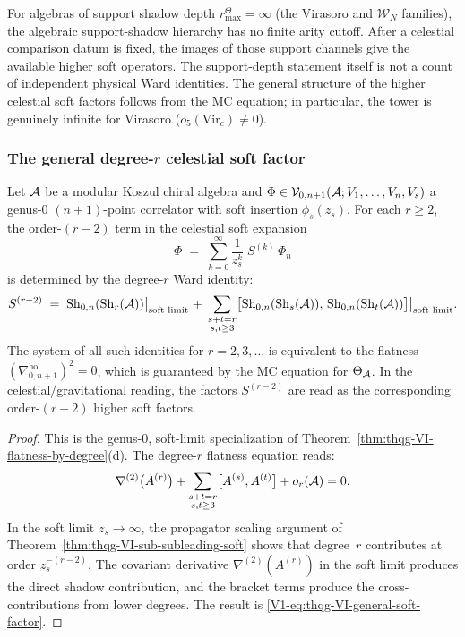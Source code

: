 For algebras of support shadow depth \(r^\Theta_{\max}=\infty\)
(the Virasoro and
$\mathcal{W}_N$ families), the algebraic support-shadow hierarchy has
no finite arity cutoff.  After a celestial comparison datum is fixed,
the images of those support channels give the available higher soft
operators.  The support-depth statement itself is not a count of
independent physical Ward identities. The general structure of the
higher celestial soft factors follows
from the MC equation; in particular, the tower is genuinely infinite for Virasoro
($o_5(\mathrm{Vir}_c) \neq 0$).

\subsubsection{The general degree-$r$ celestial soft factor}

\begin{theorem}
Let $\mathcal{A}$ be a modular Koszul chiral algebra and
$\Phi \in \mathcal{V}_{0,n+1}(\mathcal{A}; V_1, \dotsc, V_n, V_s)$ a genus-$0$
$(n+1)$-point correlator with soft insertion $\phi_s(z_s)$.
For each $r \geq 2$, the order-$(r-2)$ term in the celestial soft
expansion
\begin{equation}%
\Phi
\;=\;
\sum_{k=0}^{\infty}
\frac{1}{z_s^k}\;S^{(k)}\,\Phi_n
\end{equation}
is determined by the degree-$r$ Ward identity:
\begin{equation}%
S^{(r-2)}
\;=\;
\Sh_{0,n}(\Sh_r(\cA))\bigl|_{\text{soft limit}}
\;+\;
\sum_{\substack{s+t=r \\ s,t \geq 3}}
\bigl[\Sh_{0,n}(\Sh_s(\cA)),\,
\Sh_{0,n}(\Sh_t(\cA))\bigr]\bigl|_{\text{soft limit}}.
\end{equation}
The system of all such identities for $r = 2, 3, \dotsc$ is
equivalent to the flatness
$(\nabla^{\mathrm{hol}}_{0,n+1})^2 = 0$,
which is guaranteed by the MC equation for $\Theta_{\mathcal{A}}$. In the
celestial/gravitational reading, the factors $S^{(r-2)}$ are read as the
corresponding order-$(r-2)$ higher soft factors.
\end{theorem}

\begin{proof}
This is the genus-$0$, soft-limit specialization of
Theorem~\ref{thm:thqg-VI-flatness-by-degree}(d). The degree-$r$
flatness equation reads:
\[
\nabla^{(2)}\bigl(A^{(r)}\bigr)
+ \sum_{\substack{s+t=r \\ s,t \geq 3}}
\bigl[A^{(s)}, A^{(t)}\bigr]
+ o_r(\mathcal{A})
= 0.
\]
In the soft limit $z_s \to \infty$, the propagator scaling argument
of Theorem~\ref{thm:thqg-VI-sub-subleading-soft} shows that
degree~$r$ contributes at order $z_s^{-(r-2)}$. The covariant
derivative $\nabla^{(2)}(A^{(r)})$ in the soft limit produces the
direct shadow contribution, and the bracket terms produce the
cross-contributions from lower degrees. The result is
\eqref{V1-eq:thqg-VI-general-soft-factor}.
\end{proof}

